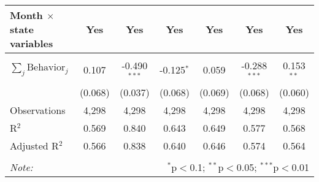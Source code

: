 \begin{tabular}{@{\extracolsep{1pt}}lcccccc}
Month $\times$ state variables & Yes & Yes & Yes & Yes & Yes & Yes \\ 
\hline \\[-1.8ex] 
$\sum_j \mathrm{Behavior}_j$ & 0.107 & -0.490$^{***}$ & -0.125$^{*}$ & 0.059 & -0.288$^{***}$ & 0.153$^{**}$ \\ 
 & (0.068) & (0.037) & (0.068) & (0.069) & (0.068) & (0.060) \\ 
Observations & 4,298 & 4,298 & 4,298 & 4,298 & 4,298 & 4,298 \\ 
R$^{2}$ & 0.569 & 0.840 & 0.643 & 0.649 & 0.577 & 0.568 \\ 
Adjusted R$^{2}$ & 0.566 & 0.838 & 0.640 & 0.646 & 0.574 & 0.564 \\ 
\hline 
\hline \\[-1.8ex] 
\textit{Note:}  & \multicolumn{6}{r}{$^{*}$p$<$0.1; $^{**}$p$<$0.05; $^{***}$p$<$0.01} \\ 
\end{tabular} 
